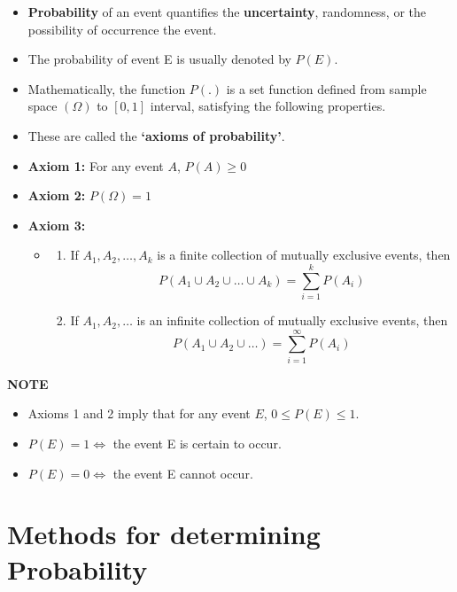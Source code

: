 \documentclass[]{book}
\providecommand{\tightlist}{%
  \setlength{\itemsep}{0pt}\setlength{\parskip}{0pt}}
\begin{document}
\begin{itemize}
\item
  \textbf{Probability} of an event quantifies the \textbf{uncertainty}, randomness, or the possibility of occurrence the event.
\item
  The probability of event E is usually denoted by \(P(E)\).
\item
  Mathematically, the function \(P(.)\) is a set function defined from sample space \((\Omega)\) to \([0, 1]\) interval, satisfying the following properties.
\item
  These are called the \textbf{`axioms of probability'}.
\item
  \textbf{Axiom 1:} For any event \(A\), \(P(A) \geq 0\)
\item
  \textbf{Axiom 2:} \(P(\Omega) = 1\)
\item
  \textbf{Axiom 3:}

  \begin{itemize}
  \item
    \begin{enumerate}
    \def\labelenumi{(\alph{enumi})}
    \tightlist
    \item
      If \(A_1, A_2, \dots, A_k\) is a finite collection of mutually exclusive events, then \[P(A_1\cup A_2\cup \dots \cup A_k)= \sum_{i=1}^kP(A_i)\]
    \item
      If \(A_1, A_2, \dots\) is an infinite collection of mutually exclusive events, then
      \[P(A_1\cup A_2\cup \dots)= \sum_{i=1}^\infty P(A_i)\]
    \end{enumerate}
  \end{itemize}
\end{itemize}

\textbf{NOTE}

\begin{itemize}
\tightlist
\item
  Axioms 1 and 2 imply that for any event \(E\), \(0 \leq P (E) \leq 1\).
\item
  \(P (E) = 1 \iff\) the event E is certain to occur.
\item
  \(P (E) = 0 \iff\) the event E cannot occur.
\end{itemize}

\hypertarget{methods-for-determining-probability}{%
\section{Methods for determining Probability}\label{methods-for-determining-probability}}
\end{document}
